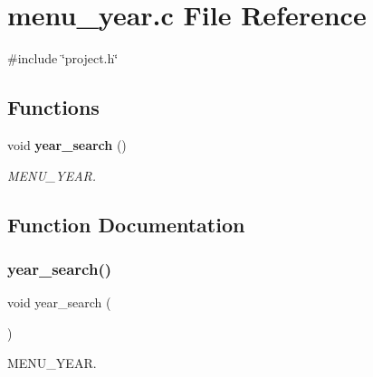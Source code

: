 \section{menu\+\_\+year.\+c File Reference}
\label{menu__year_8c}
{\ttfamily \#include \char`\"{}project.\+h\char`\"{}}\newline
\subsection*{Functions}
\begin{DoxyCompactItemize}
\item 
void \textbf{ year\+\_\+search} ()
\begin{DoxyCompactList}\small\item\em M\+E\+N\+U\+\_\+\+Y\+E\+AR. \end{DoxyCompactList}\end{DoxyCompactItemize}


\subsection{Function Documentation}
\mbox{\label{menu__year_8c_aefb0e0039c204086395ce878ebc4cac0}} 
\subsubsection{year\_search()}
{\footnotesize\ttfamily void year\+\_\+search (\begin{DoxyParamCaption}{ }\end{DoxyParamCaption})}



M\+E\+N\+U\+\_\+\+Y\+E\+AR. 


